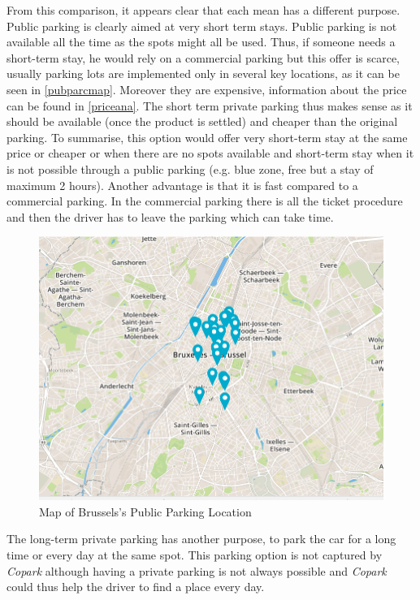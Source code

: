 \documentclass[12pt,a4paper,oneside]{book}
\newcommand{\bp}{\textit{Copark}}
\begin{document}
From this comparison, it appears clear that each mean has a different purpose. Public parking is clearly aimed at very short term stays. Public parking is not available all the time as the spots might all be used. Thus, if someone needs a short-term stay, he would rely on a commercial parking but this offer is scarce, usually parking lots are implemented only in several key locations, as it can be seen in \autoref{pubparcmap}. Moreover they are expensive, information about the price can be found in \autoref{priceana}. The short term private parking thus makes sense as it should be available (once the product is settled) and cheaper than the original parking. To summarise, this option would offer very short-term stay at the same price or cheaper or when there are no spots available and short-term stay when it is not possible through a public parking (e.g. blue zone, free but a stay of maximum 2 hours). Another advantage is that it is fast compared to a commercial parking. In the commercial parking there is all the ticket procedure and then the driver has to leave the parking which can take time.\\

\begin{figure}[h]
\centering
\caption{Map of Brussels's Public Parking Location\cite{pubparkmap}}
\label{pubparcmap}
\includegraphics[keepaspectratio=true,width=\textwidth-2cm]{../images/publicpark.png}
\end{figure}

The long-term private parking has another purpose, to park the car for a long time or every day at the same spot. This parking option is not captured by \bp{} although having a private parking is not always possible and \bp{} could thus help the driver to find a place every day.
\end{document}
